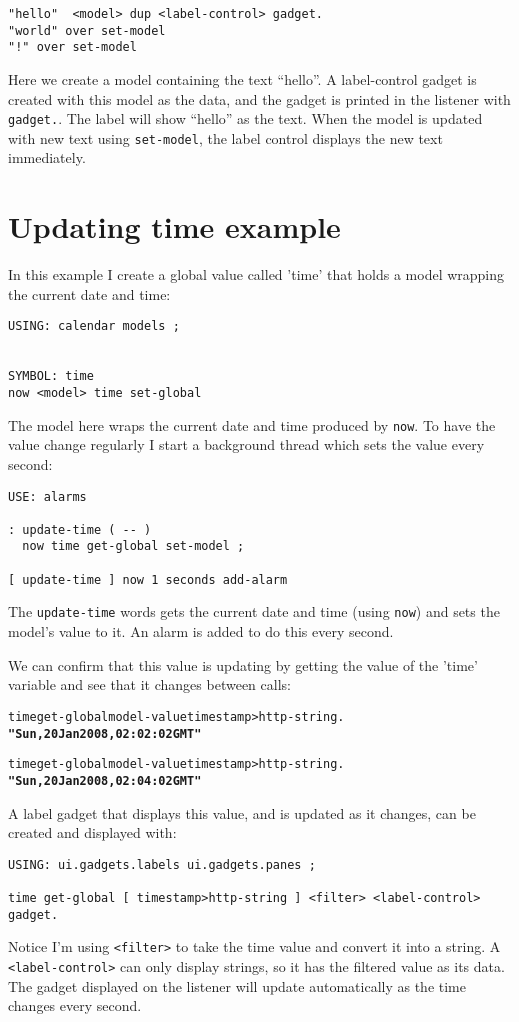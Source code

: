 \begin{verbatim}
"hello"  <model> dup <label-control> gadget.
"world" over set-model
"!" over set-model
\end{verbatim}

Here we create a model containing the text ``hello''. A label-control gadget is created with this model as the data, and the gadget is printed in the listener with \verb|gadget.|. The label will show ``hello'' as the text. When the model is updated with new text using \verb|set-model|, the label control displays the new text immediately.

\section{Updating time example}

In this example I create a global value called 'time' that holds a
model wrapping the current date and time:

\begin{verbatim}
USING: calendar models ;


SYMBOL: time
now <model> time set-global
\end{verbatim}

The model here wraps the current date and time produced by
\verb|now|. To have the value change regularly I start a background
thread which sets the value every second:

\begin{verbatim}
USE: alarms

: update-time ( -- )
  now time get-global set-model ;

[ update-time ] now 1 seconds add-alarm
\end{verbatim}

The \verb|update-time| words gets the current date and time (using \verb|now|)
and sets the model's value to it. An alarm is added to do this every second.

We can confirm that this value is updating by getting the value of
the 'time' variable and see that it changes between calls:

\begin{alltt}
time get-global model-value timestamp>http-string .
  \textbf{"Sun, 20 Jan 2008, 02:02:02 GMT"} 

time get-global model-value timestamp>http-string .
  \textbf{"Sun, 20 Jan 2008, 02:04:02 GMT" }
\end{alltt}

A label gadget that displays this value, and is updated as it changes,
can be created and displayed with:

\begin{verbatim}
USING: ui.gadgets.labels ui.gadgets.panes ;

time get-global [ timestamp>http-string ] <filter> <label-control> gadget.
\end{verbatim}

Notice I'm using \verb|<filter>| to take the time value and convert it into a string. A \verb|<label-control>| can only display strings, so it has the filtered value as its data. The gadget displayed on the listener will update automatically as the time changes every second.

